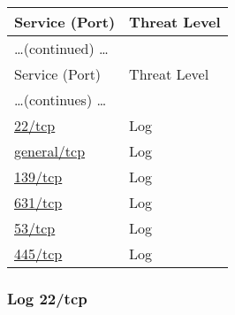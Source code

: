 \documentclass{article}
\begin{document}
\begin{longtable}{|l|l|}
\hline
\rowcolor{gvm_report}Service (Port)&Threat Level\\
\hline
\endfirsthead
\multicolumn{2}{l}{\hfill\ldots (continued) \ldots}\\
\hline
\rowcolor{gvm_report}Service (Port)&Threat Level\\
\hline
\endhead
\hline
\multicolumn{2}{l}{\ldots (continues) \ldots}\\
\endfoot
\hline
\endlastfoot
\hline
\hyperref[port:192.168.178.20 22/tcp Log]{22/tcp}&Log\\
\hline
\hyperref[port:192.168.178.20 general/tcp Log]{general/tcp}&Log\\
\hline
\hyperref[port:192.168.178.20 139/tcp Log]{139/tcp}&Log\\
\hline
\hyperref[port:192.168.178.20 631/tcp Log]{631/tcp}&Log\\
\hline
\hyperref[port:192.168.178.20 53/tcp Log]{53/tcp}&Log\\
\hline
\hyperref[port:192.168.178.20 445/tcp Log]{445/tcp}&Log\\
\hline
\end{longtable}



\subsubsection{Log 22/tcp}
\label{port:192.168.178.20 22/tcp Log}
\end{document}

